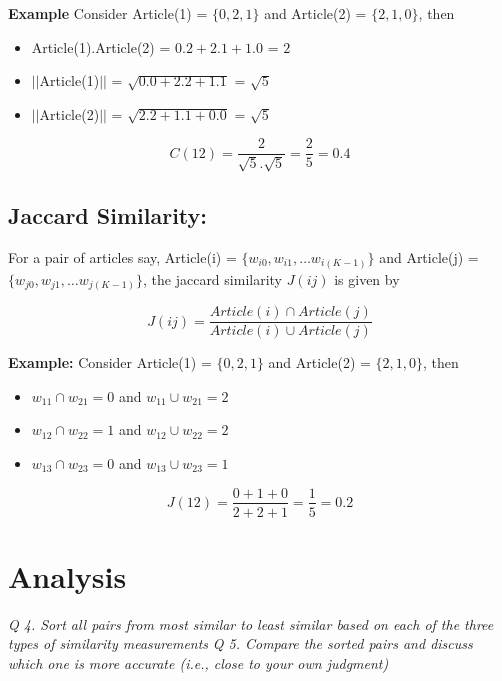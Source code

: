 \documentclass[journal,onecolumn]{IEEEtran}
\begin{document}
\textbf{Example}  Consider Article(1) = $\{0, 2, 1\}$ and Article(2) = $\{2, 1, 0\}$, then
\begin{itemize}[label={}]

\item Article(1).Article(2) = $ 0.2 + 2.1 + 1.0$ = $2$
\item $||$Article(1)$||$ = $\sqrt{0.0 + 2.2 + 1.1}$ = $\sqrt{5}$
\item $||$Article(2)$||$ = $\sqrt{2.2 + 1.1 + 0.0}$ = $\sqrt{5}$

\end{itemize}

$$C(12) = \frac{2}{\sqrt{5}.\sqrt{5}} = \frac{2}{5} = 0.4$$
\subsection{Jaccard Similarity:}
For a pair of articles say, Article(i) = $\{w_{i0}, w_{i1}, \dots w_{i(K-1)} \}$ and Article(j) = $\{w_{j0}, w_{j1}, \dots w_{j(K-1)} \}$, the jaccard similarity $J(ij)$ is given by

\begin{equation}\label{jaccard}
J(ij) = \frac{Article(i) \cap Article(j)}{Article(i) \cup Article(j)}
\end{equation}


\textbf{Example: } Consider Article(1) = $\{0, 2, 1\}$ and Article(2) = $\{2, 1, 0\}$, then

\begin{itemize}[label={}]
\item $w_{11} \cap w_{21} = 0$  and $w_{11} \cup w_{21} = 2$ 
\item $w_{12} \cap w_{22} = 1$ and $w_{12} \cup w_{22} = 2$ 
\item $w_{13} \cap w_{23} = 0$ and $w_{13} \cup w_{23} = 1$ 
\end{itemize}

$$ J(12) = \frac{0 + 1 + 0}{2 + 2 + 1} = \frac{1}{5} = 0.2$$




\section{\textbf{ Analysis}}

\textit{Q 4.  Sort all pairs from most similar to least similar based on each of the three types of similarity
measurements } \textit{Q 5. Compare the sorted pairs and discuss which one is more accurate (i.e., close to your own judgment)}
\end{document}

